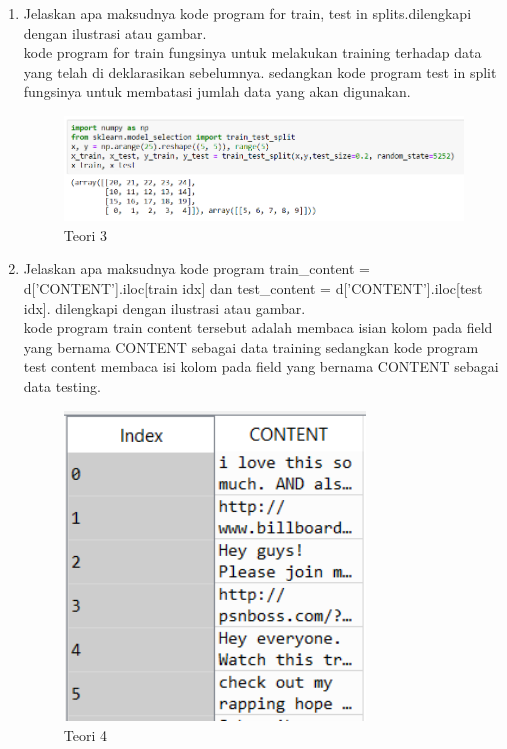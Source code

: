 \begin{enumerate}
\item Jelaskan apa maksudnya kode program for train, test in splits.dilengkapi dengan ilustrasi atau gambar.
	\hfill\\
	kode program for train fungsinya untuk melakukan training terhadap data yang telah di deklarasikan sebelumnya. sedangkan kode program test in split fungsinya untuk membatasi jumlah data yang akan digunakan.

\begin{figure}[H]
    \includegraphics[width=12cm]{figures/1174084/7/teori3.png}
    \centering
    \caption{Teori 3}
\end{figure}

\item Jelaskan apa maksudnya kode program train\_content = d[’CONTENT’].iloc[train idx] dan test\_content = d[’CONTENT’].iloc[test idx]. dilengkapi dengan ilustrasi atau gambar.
\hfill\\
	kode program train content tersebut adalah membaca isian kolom pada field yang bernama CONTENT sebagai data training sedangkan kode program test content membaca isi kolom pada field yang bernama CONTENT sebagai data testing.
	
\begin{figure}[H]
    \includegraphics[width=8cm]{figures/1174084/7/teori4.png}
    \centering
    \caption{Teori 4}
\end{figure}


\end{enumerate}
